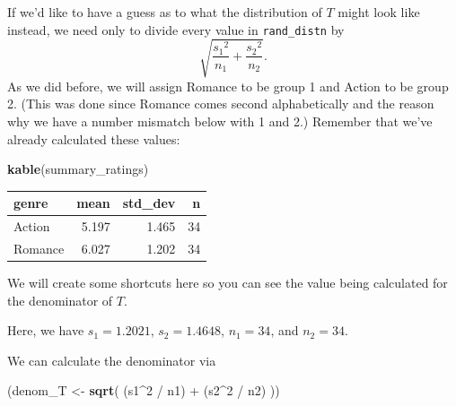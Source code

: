 \documentclass[]{tufte-book}
\newenvironment{Shaded}{\begin{snugshade}}{\end{snugshade}}
\newcommand{\KeywordTok}[1]{\textcolor[rgb]{0.13,0.29,0.53}{\textbf{{#1}}}}
\newcommand{\DecValTok}[1]{\textcolor[rgb]{0.00,0.00,0.81}{{#1}}}
\newcommand{\StringTok}[1]{\textcolor[rgb]{0.31,0.60,0.02}{{#1}}}
\newcommand{\NormalTok}[1]{{#1}}
\begin{document}
If we'd like to have a guess as to what the distribution of \(T\) might
look like instead, we need only to divide every value in
\texttt{rand\_distn} by
\[\sqrt{\dfrac{{s_1}^2}{n_1} + \dfrac{{s_2}^2}{n_2}}.\] As we did
before, we will assign Romance to be group 1 and Action to be group 2.
(This was done since Romance comes second alphabetically and the reason
why we have a number mismatch below with 1 and 2.) Remember that we've
already calculated these values:

\begin{Shaded}
\begin{Highlighting}[]
\KeywordTok{kable}\NormalTok{(summary_ratings)}
\end{Highlighting}
\end{Shaded}

\begin{tabular}{l|r|r|r}
\hline
genre & mean & std\_dev & n\\
\hline
Action & 5.197 & 1.465 & 34\\
\hline
Romance & 6.027 & 1.202 & 34\\
\hline
\end{tabular}

We will create some shortcuts here so you can see the value being
calculated for the denominator of \(T\).

\begin{Shaded}
\end{Shaded}

Here, we have \(s_1 = 1.2021\), \(s_2 = 1.4648\), \(n_1 = 34\), and
\(n_2 = 34\).

We can calculate the denominator via

\begin{Shaded}
\begin{Highlighting}[]
\NormalTok{(denom_T <-}\StringTok{ }\KeywordTok{sqrt}\NormalTok{( (s1^}\DecValTok{2} \NormalTok{/}\StringTok{ }\NormalTok{n1) +}\StringTok{ }\NormalTok{(s2^}\DecValTok{2} \NormalTok{/}\StringTok{ }\NormalTok{n2) ))}
\end{Highlighting}
\end{Shaded}
\end{document}
